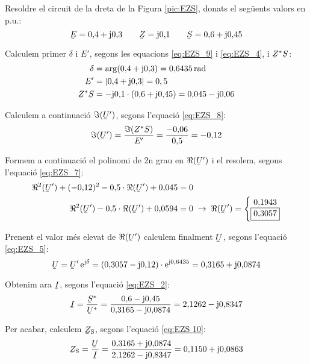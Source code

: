 \begin{exemple}
Resoldre el circuit de la dreta de la Figura \vref{pic:EZS}, donats el seg\"{u}ents valors en p.u.:
\[
   \cmplx{E} = 0{,}4 + \ju 0{,}3 \qquad \cmplx{Z} = \ju 0{,}1 \qquad
   \cmplx{S} = 0{,}6 + \ju 0{,}45
\]

Calculem primer $\delta$ i $E'$, segons les equacions \eqref{eq:EZS_9} i \eqref{eq:EZS_4},
i $\cmplx{Z}^* \cmplx{S}$:
\begin{align*}
   \delta &= \arg(0{,}4 + \ju 0{,}3) = 0{,}6435\unit{rad} \\
   E' &= |0{,}4 + \ju 0{,}3| = 0{,5} \\
   \cmplx{Z}^* \cmplx{S} &= - \ju 0{,}1 \cdot (0{,}6 + \ju 0{,}45) = 0{,}045 - \ju 0{,}06
\end{align*}

Calculem a continuaci\'{o} $\Im(\cmplx{U}')$, segons l'equaci\'{o} \eqref{eq:EZS_8}:
\[
   \Im(\cmplx{U}') = \frac{\Im(\cmplx{Z}^* \cmplx{S})}{E'} = \frac{-0{,}06}{0{,}5} = -0{,}12
\]

Formem a continuaci\'{o} el polinomi de 2n grau en $\Re(\cmplx{U}')$ i el resolem, segons l'equaci\'{o} \eqref{eq:EZS_7}:
\begin{align*}
   \Re^2(\cmplx{U}') + (-0{,}12)^2 - 0{,}5 \cdot \Re(\cmplx{U}') + 0{,}045 &= 0 \\
   \Re^2(\cmplx{U}') - 0{,}5 \cdot \Re(\cmplx{U}') + 0{,}0594 &= 0  \;\rightarrow\; \Re(\cmplx{U}') =
   \left\{ \begin{matrix}
     0{,}1943 \\
     \boxed{0{,}3057}
   \end{matrix}
   \right.
\end{align*}

Prenent el valor m\'{e}s elevat de $\Re(\cmplx{U}')$ calculem finalment $\cmplx{U}$, segons l'equaci\'{o} \eqref{eq:EZS_5}:
\[
   \cmplx{U} = \cmplx{U}' \, \eu^{\ju \delta} = (0{,}3057 - \ju 0{,}12) \cdot \eu^{\ju 0{,}6435} =
   0{,}3165 + \ju 0{,}0874
\]

Obtenim ara $\cmplx{I}$, segons l'equaci\'{o} \eqref{eq:EZS_2}:
\[
   \cmplx{I} = \frac{\cmplx{S}^*}{\cmplx{U}^*} = \frac{0{,}6-\ju 0{,}45}{0{,}3165 - \ju 0{,}0874}
   = 2{,}1262 - \ju 0{,}8347
\]

Per acabar, calculem $\cmplx{Z}\ped{S}$, segons l'equaci\'{o}
\eqref{eq:EZS 10}:
\[
    \cmplx{Z}\ped{S} = \frac{\cmplx{U}}{\cmplx{I}} = \frac{0{,}3165 + \ju 0{,}0874}
    {2{,}1262 - \ju 0{,}8347} = 0{,}1150 + \ju 0{,}0863
\]

\end{exemple}



